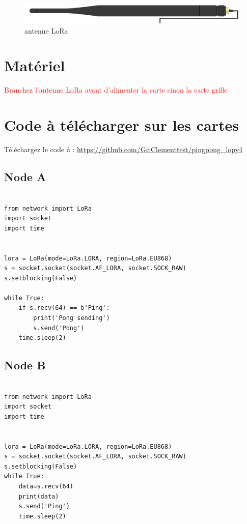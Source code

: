 \documentclass{article}
\begin{document}
    \begin{figure}[H]
\begin{center}
\advance\leftskip-3cm
\advance\rightskip-3cm
\includegraphics[keepaspectratio=true,scale=0.2]{lora_antenna.png}
\caption{antenne LoRa}
\label{visina8}
\end{center}\end{figure}


\section{Matériel}
\textcolor{red}{Branchez l'antenne LoRa avant d'alimenter la carte sinon la carte grille}

\section{Code à télécharger sur les cartes}

 Téléchargez le code à : \url{https://github.com/GitClementtest/pingpong_lopy4} \\


\subsection{Node A}
\begin{verbatim}

from network import LoRa
import socket
import time


lora = LoRa(mode=LoRa.LORA, region=LoRa.EU868)
s = socket.socket(socket.AF_LORA, socket.SOCK_RAW)
s.setblocking(False)

while True:
    if s.recv(64) == b'Ping':
        print('Pong sending')
        s.send('Pong')
    time.sleep(2)

\end{verbatim}




\subsection{Node B}

\begin{verbatim}

from network import LoRa
import socket
import time


lora = LoRa(mode=LoRa.LORA, region=LoRa.EU868)
s = socket.socket(socket.AF_LORA, socket.SOCK_RAW)
s.setblocking(False)
while True:
    data=s.recv(64)
    print(data)
    s.send('Ping')
    time.sleep(2)

\end{verbatim}
\end{document}
